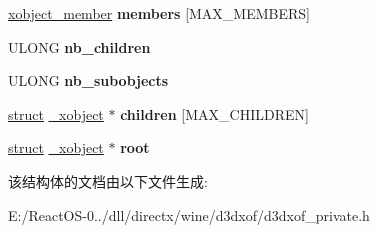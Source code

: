 \begin{DoxyCompactItemize}
\mbox{\label{struct__xobject_a6fc7e79cf832feaef0ccced82f9e2f8f}} 
\hyperlink{structxobject__member}{xobject\+\_\+member} {\bfseries members} \mbox{[}M\+A\+X\+\_\+\+M\+E\+M\+B\+E\+RS\mbox{]}
\item 
\mbox{\label{struct__xobject_aef7e5141b73d9ef2e4123a28135e9a11}} 
U\+L\+O\+NG {\bfseries nb\+\_\+children}
\item 
\mbox{\label{struct__xobject_a170c2396880607fb311f5842e195377b}} 
U\+L\+O\+NG {\bfseries nb\+\_\+subobjects}
\item 
\mbox{\label{struct__xobject_aaff9febf9a98c230ef60c2fa28041f41}} 
\hyperlink{interfacestruct}{struct} \hyperlink{struct__xobject}{\+\_\+xobject} $\ast$ {\bfseries children} \mbox{[}M\+A\+X\+\_\+\+C\+H\+I\+L\+D\+R\+EN\mbox{]}
\item 
\mbox{\label{struct__xobject_abd1421e0b255c84d2527440982abab06}} 
\hyperlink{interfacestruct}{struct} \hyperlink{struct__xobject}{\+\_\+xobject} $\ast$ {\bfseries root}
\end{DoxyCompactItemize}


该结构体的文档由以下文件生成\+:\begin{DoxyCompactItemize}
\item 
E\+:/\+React\+O\+S-\/0../dll/directx/wine/d3dxof/d3dxof\+\_\+private.\+h\end{DoxyCompactItemize}
